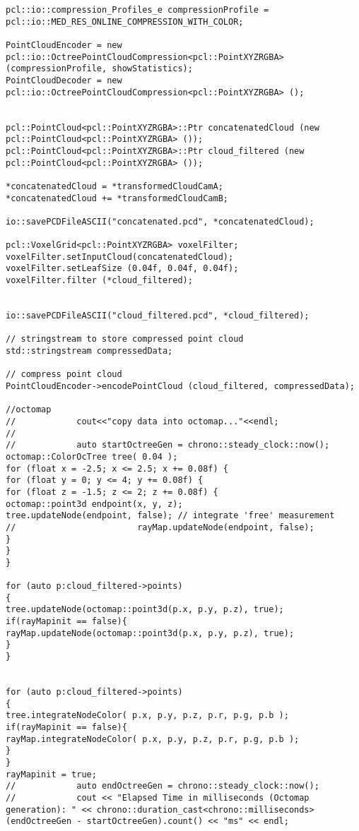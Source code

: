 \begin{lstlisting}[frame = single, label={lst:cppread1}]
pcl::io::compression_Profiles_e compressionProfile = pcl::io::MED_RES_ONLINE_COMPRESSION_WITH_COLOR;

PointCloudEncoder = new pcl::io::OctreePointCloudCompression<pcl::PointXYZRGBA> (compressionProfile, showStatistics);
PointCloudDecoder = new pcl::io::OctreePointCloudCompression<pcl::PointXYZRGBA> ();


pcl::PointCloud<pcl::PointXYZRGBA>::Ptr concatenatedCloud (new pcl::PointCloud<pcl::PointXYZRGBA> ());
pcl::PointCloud<pcl::PointXYZRGBA>::Ptr cloud_filtered (new pcl::PointCloud<pcl::PointXYZRGBA> ());

*concatenatedCloud = *transformedCloudCamA;
*concatenatedCloud += *transformedCloudCamB;

io::savePCDFileASCII("concatenated.pcd", *concatenatedCloud);

pcl::VoxelGrid<pcl::PointXYZRGBA> voxelFilter;
voxelFilter.setInputCloud(concatenatedCloud);
voxelFilter.setLeafSize (0.04f, 0.04f, 0.04f);
voxelFilter.filter (*cloud_filtered);


io::savePCDFileASCII("cloud_filtered.pcd", *cloud_filtered);

// stringstream to store compressed point cloud
std::stringstream compressedData;

// compress point cloud
PointCloudEncoder->encodePointCloud (cloud_filtered, compressedData);

//octomap
//            cout<<"copy data into octomap..."<<endl;
//
//            auto startOctreeGen = chrono::steady_clock::now();
octomap::ColorOcTree tree( 0.04 );
for (float x = -2.5; x <= 2.5; x += 0.08f) {
for (float y = 0; y <= 4; y += 0.08f) {
for (float z = -1.5; z <= 2; z += 0.08f) {
octomap::point3d endpoint(x, y, z);
tree.updateNode(endpoint, false); // integrate 'free' measurement
//                        rayMap.updateNode(endpoint, false);
}
}
}

for (auto p:cloud_filtered->points)
{
tree.updateNode(octomap::point3d(p.x, p.y, p.z), true);
if(rayMapinit == false){
rayMap.updateNode(octomap::point3d(p.x, p.y, p.z), true);
}
}


for (auto p:cloud_filtered->points)
{
tree.integrateNodeColor( p.x, p.y, p.z, p.r, p.g, p.b );
if(rayMapinit == false){
rayMap.integrateNodeColor( p.x, p.y, p.z, p.r, p.g, p.b );
}
}
rayMapinit = true;
//            auto endOctreeGen = chrono::steady_clock::now();
//            cout << "Elapsed Time in milliseconds (Octomap generation): " << chrono::duration_cast<chrono::milliseconds>(endOctreeGen - startOctreeGen).count() << "ms" << endl;


\end{lstlisting}
